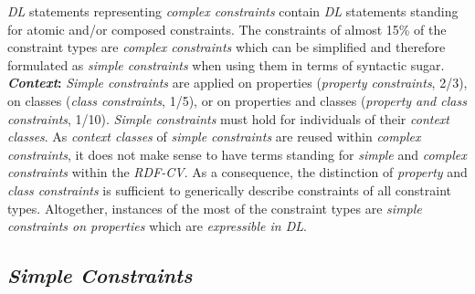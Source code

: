 \documentclass[a4paper,fontsize=11pt]{scrartcl}
\newcommand{\tb}[1]{\todo[size=\small, color=green!40]{\textbf{Thomas:} #1}}
\begin{document}
\emph{DL} statements representing \emph{complex constraints} contain \emph{DL} statements standing for atomic and/or composed constraints. 
The constraints of almost 15\% of the constraint types are \emph{complex constraints}
which can be simplified and therefore formulated as \emph{simple constraints} when using them in terms of syntactic sugar.
\textbf{\emph{Context}:}
\emph{Simple constraints} are applied on properties (\emph{property constraints}, 2/3),
on classes (\emph{class constraints}, 1/5), or
on properties and classes (\emph{property and class constraints}, 1/10).
\emph{Simple constraints} must hold for individuals of their \emph{context classes}.
As \emph{context classes} of \emph{simple constraints} are reused within \emph{complex constraints},
it does not make sense to have terms standing for \emph{simple} and \emph{complex constraints} within the \emph{RDF-CV}. 
As a consequence, the distinction of \emph{property} and \emph{class constraints} is sufficient to generically describe constraints of all constraint types.
Altogether, instances of the most of the constraint types are \emph{simple constraints on properties} which are \emph{expressible in DL}. 

\subsection{\emph{Simple Constraints}}
\end{document}
